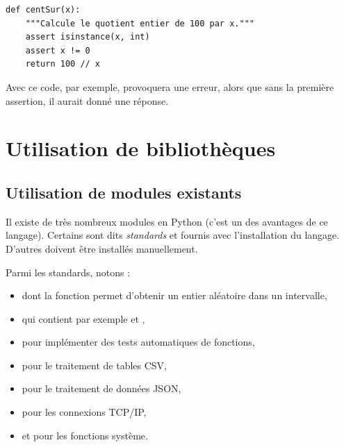 \begin{verbatim}
def centSur(x):
    """Calcule le quotient entier de 100 par x."""
    assert isinstance(x, int)
    assert x != 0
    return 100 // x
\end{verbatim}

Avec ce code, par exemple,  provoquera une erreur, alors que sans la première assertion, il aurait donné une réponse.

\chapter{Utilisation de bibliothèques}


\section{Utilisation de modules existants}

Il existe de très nombreux modules en Python (c'est un des avantages de ce langage). Certains sont dits \emph{standards} et fournis avec l'installation du langage. D'autres doivent être installés manuellement.

Parmi les standards, notons :

\begin{itemize}
	\item {} dont la fonction  permet d'obtenir un entier aléatoire dans un intervalle,
	\item {} qui contient par exemple  et ,
	\item {} pour implémenter des tests automatiques de fonctions,
	\item {} pour le traitement de tables CSV,
	\item {} pour le traitement de données JSON,
	\item {} pour les connexions TCP/IP,
	\item {} et  pour les fonctions système.
\end{itemize}

